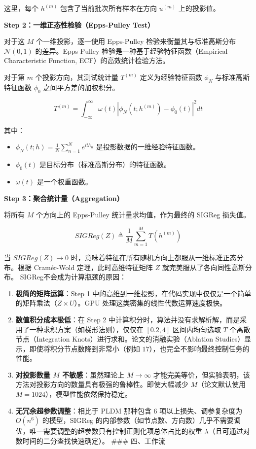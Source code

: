 这里，每个 \(h^{(m)}\) 包含了当前批次所有样本在方向 \(u^{(m)}\) 上的投影值。

\textbf{Step 2：一维正态性检验（Epps-Pulley Test）}

对于这 \(M\) 个一维投影，逐一使用 Epps-Pulley 检验来衡量其与标准高斯分布 \(\mathcal{N}(0,1)\) 的差异。Epps-Pulley 检验是一种基于经验特征函数（Empirical Characteristic Function, ECF）的高效统计检验方法。

对于第 \(m\) 个投影方向，其测试统计量 \(T^{(m)}\) 定义为经验特征函数 \(\phi_N\) 与标准高斯特征函数 \(\phi_0\) 之间平方差的加权积分。

\[
T^{(m)} = \int_{-\infty}^{\infty} \omega(t)\left|\phi_N(t;h^{(m)}) - \phi_0(t)\right|^2 dt
\]

其中：

\begin{itemize}
\tightlist
\item
  \(\phi_N(t;h)=\frac{1}{N}\sum_{n=1}^{N} e^{ith_n}\) 是投影数据的一维经验特征函数。
\item
  \(\phi_0(t)\) 是目标分布（标准高斯分布）的特征函数。
\item
  \(\omega(t)\) 是一个权重函数。
\end{itemize}

\textbf{Step 3：聚合统计量（Aggregation）}

将所有 \(M\) 个方向上的 Epps-Pulley 统计量求均值，作为最终的 SIGReg 损失值。

\[
SIGReg(Z) \triangleq \frac{1}{M}\sum_{m=1}^{M}T(h^{(m)})
\]

当 \(SIGReg(Z)\to 0\) 时，意味着特征在所有随机方向上都服从一维标准正态分布。根据 Cramér-Wold 定理，此时高维特征矩阵 \(Z\) 就完美服从了各向同性高斯分布。
SIGReg不会成为计算瓶颈的原因：

\begin{enumerate}
\def\labelenumi{\arabic{enumi}.}
\tightlist
\item
  \textbf{极简的矩阵运算}：Step 1 中的高维到一维投影，在代码实现中仅仅是一个简单的矩阵乘法（\(Z\times U\)）。GPU 处理这类密集的线性代数运算速度极快。
\item
  \textbf{数值积分成本极低}：在 Step 2 中计算积分时，算法并没有求解析解，而是采用了一种求积方案（如梯形法则），仅仅在 \([0.2,4]\) 区间内均匀选取 \(T\) 个离散节点（Integration Knots）进行求和。论文的消融实验（Ablation Studies）显示，即使将积分节点数降到非常小（例如 \(17\)），也完全不影响最终控制任务的性能。
\item
  \textbf{对投影数量 \(M\) 不敏感}：虽然理论上 \(M\to\infty\) 才能完美等价，但实验表明，该方法对投影方向的数量具有极强的鲁棒性。即使大幅减少 \(M\)（论文默认使用 \(M=1024\)），模型性能依然保持稳定。
\item
  \textbf{无冗余超参数调整}：相比于 PLDM 那种包含 \(6\) 项以上损失、调参复杂度为 \(O(n^6)\) 的模型，SIGReg 的内部参数（如节点数、方向数）几乎不需要调优，唯一需要调整的超参数只有控制正则化项总体占比的权重 \(\lambda\)（且可通过对数时间的二分查找快速确定）。
  \#\#\# 四、工作流
\end{enumerate}

